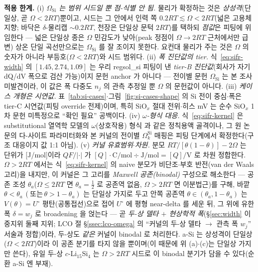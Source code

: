\begin{warnbox}
\textbf{적용 한계.} (i) \emph{$\Omega_\mathrm{Si}$ 는 범위 시드일 뿐 점-식별 안 됨.} 물리가 확정하는 것은
\emph{상성격}(단일상, 곧 $\Omega<2RT$)뿐이고, 시드는 그 안에서 인력 쪽 $0.2RT\lesssim\Omega<2RT$(넓은 고용체 지향;
바닥은 $\delta$-물리캡 $\sim0.2RT$, 천장은 단일상 문턱 $2RT$)를 택하되 \emph{점값}은 피팅에 위임한다 --- 넓은
단일상 종은 $\Omega$ 민감도가 낮아(peak 정점이 $\Omega{\to}2RT$ 근처에서만 급변) 상온 단일 곡선만으로는
$\Omega_\mathrm{Si}$ 를 잘 조이지 못한다. 요컨대 물리가 주는 것은 $\Omega$ 의 숫자가 아니라 부등호($\Omega<2RT$)와
시드 범위다. (ii) \emph{폭 진단값의 tier.} 식~\eqref{eq:sifr-width} 의 $[1.45,2.74,1.09]$ 는 우리 regsol\_si 피팅이
낸 \emph{tier-B 진단값}(회사가 자기 dQ/dV 폭으로 검산 가능)이지 문헌 anchor 가 아니다 --- 전이별 문헌
$\Omega_\mathrm{Si}$ 는 본 조사 미발견이라, 이 값은 폭 다중도 $n_j$ 의 관측 추정일 뿐 $\Omega$ 의 문헌값이 아니다.
(iii) \emph{케이스 개형은 시연값.} 표~\ref{tab:si-cases}$\cdot$그림~\ref{fig:si-cases-shape} 의 Si 전이 중심$\cdot$폭은
tier-C 시연값(피팅 override 전제)이며, 특히 SiO$_x$ 절대 전위$\cdot$히스 mV 는 순수 SiO$_x$ 1차 문헌 미특정으로
``확인 필요'' 공백이다. (iv) \emph{$\omega$-형식 대응.} 식~\eqref{eq:sifr-kernel} 은 substitutional 열역학 모델의
$\omega$(상호작용) 형식 \cite{verbrugge2017} 과 같은 정칙용액 골격이나, 그 원 논문의 다-사이트 파라미터화와 본
커널의 전이별 $\Omega_k^\mathrm{Si}$ 매핑은 피팅 단계에서 확정한다(구조 대응이지 값 1:1 아님). (v) \emph{커널
유효범위$\cdot$차원.} 분모 $RT/[\theta(1-\theta)]-2\Omega$ 는 단위가 [J/mol]이라 $QF/|\cdot|$ 가
$[Q]{\cdot}\mathrm{C/mol}\div\mathrm{J/mol}={[Q]}/\mathrm V$ 로 차원 정합한다. $\Omega>2RT$ 에서는 식~\eqref{eq:sifr-kernel} 의 naive 분모가 비단조$\cdot$부호 반전(van der Waals 고리)을
내지만, 이 커널은 그 고리를 \emph{Maxwell 공존(binodal)} 구성으로 해소한다 ---
공존 조성 $\theta_a$($\Omega\!\le\!2RT$ 면 $\theta_a{=}\tfrac12$ 로 공존역 없음,
$\Omega\!>\!2RT$ 면 이분법근)를 구해, 바깥 $\theta\!<\!\theta_a\,(\text{또는}\,\theta\!>\!1{-}\theta_a)$ 는 단일상
가지로 두고 안쪽 공존역 $\theta\!\in\!(\theta_a,1{-}\theta_a)$ 는 $V(\theta){=}U^\circ$ 평탄(공통접선)으로 접어
$U^\circ$ 에 평형 near-delta 를 세운 뒤, 그 위에 유한 폭 $\delta{=}w_j$ 로 broadening 을 얹는다 ---
곧 \emph{두-상 델타 $+$ 현상학적 폭}(\S\ref{sec:width} 이중지위 둘째 지위; LCO 절 \S\ref{ssec:lco-omega} 의
``커널의 두-상 델타 $\to$ 관측 폭 $w_j$'' 서술과 정합)이라, 두-상도 \emph{같은} 커널이 binodal 로 처리한다.
a-Si 는 상성격이 단일상($\Omega<2RT$)이라 이 공존 분기를 타지 않을 뿐이며(이 때문에 위 (a)$\cdot$(c)는 단일상
가지만 쓴다), 유일 두-상 $c$-Li$_{15}$Si$_4$ 는 $\Omega>2RT$ 시드로 이 binodal 분기가 담을 수 있다(순환 a-Si 엔 부재).
\end{warnbox}

